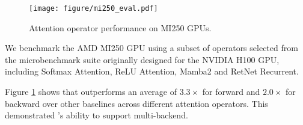 \begin{figure}
    \centering
    \texttt{[image: figure/mi250\_eval.pdf]}
    \vspace{-5mm}
    \caption{Attention operator performance on MI250 GPUs.}
    \vspace{-5mm}
    \label{fig:mi250-eval}
\end{figure}

We benchmark the AMD MI250 GPU using a subset of operators selected from the microbenchmark suite originally designed for the NVIDIA H100 GPU, including Softmax Attention, ReLU Attention, Mamba2 and RetNet Recurrent.

Figure \ref{fig:mi250-eval} shows that \oursys{} outperforms an average of $3.3\times$ for forward and $2.0\times$ for backward over other baselines across different attention operators. 
This demonstrated \oursys{}'s ability to support multi-backend.

